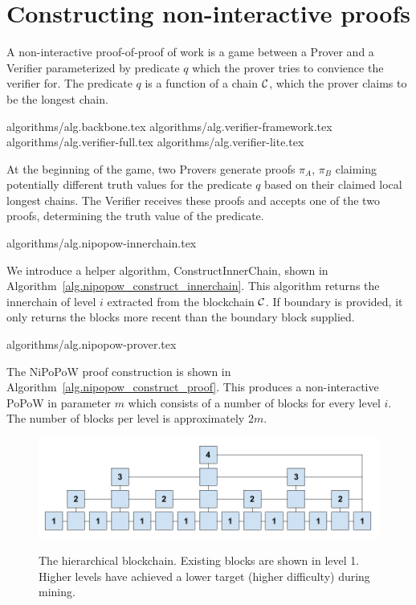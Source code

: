 \section{Constructing non-interactive proofs}

A non-interactive proof-of-proof of work is a game between a Prover and a
Verifier parameterized by predicate $q$ which the prover tries to convience the
verifier for. The predicate $q$ is a function of a chain $\mathcal{C}$, which the
prover claims to be the longest chain.

{algorithms/alg.backbone.tex}
{algorithms/alg.verifier-framework.tex}
{algorithms/alg.verifier-full.tex}
{algorithms/alg.verifier-lite.tex}

At the beginning of the game, two Provers generate proofs $\pi_A$, $\pi_B$
claiming potentially different truth values for the predicate $q$ based on
their claimed local longest chains. The Verifier receives these proofs and
accepts one of the two proofs, determining the truth value of the predicate.

{algorithms/alg.nipopow-innerchain.tex}

We introduce a helper algorithm, ConstructInnerChain, shown in
Algorithm~\ref{alg.nipopow_construct_innerchain}. This algorithm returns the innerchain
of level $i$ extracted from the blockchain $\mathcal{C}$. If boundary is provided,
it only returns the blocks more recent than the boundary block supplied.

{algorithms/alg.nipopow-prover.tex}

The NiPoPoW proof construction is shown in Algorithm~\ref{alg.nipopow_construct_proof}.
This produces a non-interactive PoPoW in parameter $m$ which consists of a
number of blocks for every level $i$. The number of blocks per level is
approximately $2m$.

\begin{figure}[h]
    \caption{The hierarchical blockchain. Existing blocks are shown in level 1.
    Higher levels have achieved a lower target (higher difficulty) during mining.}
    \centering
    \includegraphics[width=\textwidth,keepaspectratio]{figures/hierarchical-ledger.png}
    \label{fig:hierarchy}
\end{figure}

